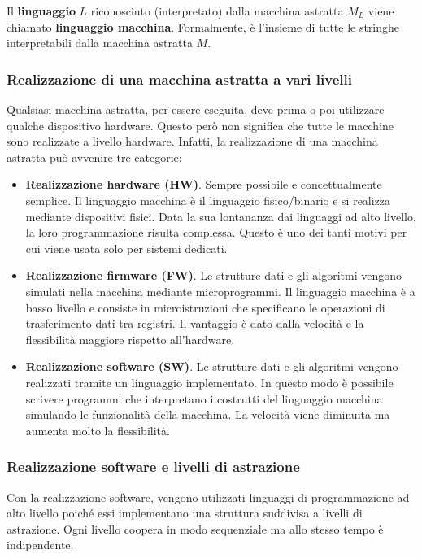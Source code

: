 \documentclass[a4paper]{article}
\begin{document}
	\noindent
	Il \textbf{linguaggio} $L$ riconosciuto (interpretato) dalla macchina astratta $M_{L}$ viene chiamato \textbf{linguaggio macchina}. Formalmente, è l'insieme di tutte le stringhe interpretabili dalla macchina astratta $M$.\newpage
	
	\subsubsection{Realizzazione di una macchina astratta a vari livelli}
	
	Qualsiasi macchina astratta, per essere eseguita, deve prima o poi utilizzare qualche dispositivo hardware. Questo però non significa che tutte le macchine sono realizzate a livello hardware. Infatti, la realizzazione di una macchina astratta può avvenire tre categorie:
	\begin{itemize}
		\item \textcolor{Red3}{\textbf{Realizzazione hardware (HW)}}. Sempre possibile e concettualmente semplice. Il linguaggio macchina è il linguaggio fisico/binario e si realizza mediante dispositivi fisici. Data la sua lontananza dai linguaggi ad alto livello, la loro programmazione risulta complessa. Questo è uno dei tanti motivi per cui viene usata solo per sistemi dedicati.
		
		\item \textcolor{Red3}{\textbf{Realizzazione firmware (FW)}}. Le strutture dati e gli algoritmi vengono simulati nella macchina mediante microprogrammi. Il linguaggio macchina è a basso livello e consiste in microistruzioni che specificano le operazioni di trasferimento dati tra registri. Il vantaggio è dato dalla velocità e la flessibilità maggiore rispetto all'hardware.
		
		\item \textcolor{Red3}{\textbf{Realizzazione software (SW)}}. Le strutture dati e gli algoritmi vengono realizzati tramite un linguaggio implementato. In questo modo è possibile scrivere programmi che interpretano i costrutti del linguaggio macchina simulando le funzionalità della macchina. La velocità viene diminuita ma aumenta molto la flessibilità.
	\end{itemize}\newpage

	\subsubsection{Realizzazione software e livelli di astrazione}
	
	Con la realizzazione software, vengono utilizzati linguaggi di programmazione ad alto livello poiché essi implementano una struttura suddivisa a livelli di astrazione. Ogni livello coopera in modo sequenziale ma allo stesso tempo è indipendente.
	
\end{document}
